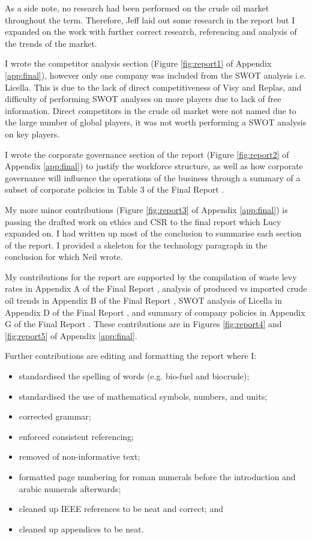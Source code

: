 \documentclass[11pt, a4, nocenter, margin=150mm]{article}
\begin{document}
	As a side note, no research had been performed on the crude oil market throughout the term. Therefore, Jeff laid out some research in the report but I expanded on the work with further correct research, referencing and analysis of the trends of the market.

	I wrote the competitor analysis section (Figure \ref{fig:report1} of Appendix \ref{app:final}), however only one company was included from the SWOT analysis i.e. Licella. This is due to the lack of direct competitiveness of Visy and Replas, and difficulty of performing SWOT analyses on more players due to lack of free information. Direct competitors in the crude oil market were not named due to the large number of global players, it was not worth performing a SWOT analysis on key players.

	I wrote the corporate governance section of the report (Figure \ref{fig:report2} of Appendix \ref{app:final}) to justify the workforce structure, as well as how corporate governance will influence the operations of the business through a summary of a subset of corporate policies in Table 3 of the Final Report \cite{report}.

	My more minor contributions (Figure \ref{fig:report3} of Appendix \ref{app:final}) is passing the drafted work on ethics and CSR to the final report which Lucy expanded on. I had written up most of the conclusion to summarise each section of the report. I provided a skeleton for the technology paragraph in the conclusion for which Neil wrote.

	My contributions for the report are supported by the compilation of waste levy rates in Appendix A of the Final Report \cite{report}, analysis of produced vs imported crude oil trends in Appendix B of the Final Report \cite{report}, SWOT analysis of Licella in Appendix D of the Final Report \cite{report}, and summary of company policies in Appendix G of the Final Report \cite{report}. These contributions are in Figures \ref{fig:report4} and \ref{fig:report5} of Appendix \ref{app:final}.

	Further contributions are editing and formatting the report where I:
	
	\begin{itemize}[noitemsep, nolistsep]
		\item standardised the spelling of words (e.g. bio-fuel and biocrude);
		\item standardised the use of mathematical symbols, numbers, and units;
		\item corrected grammar;
		\item enforced consistent referencing;
		\item removed of non-informative text;
		\item formatted page numbering for roman numerals before the introduction and arabic numerals afterwards;
		\item cleaned up IEEE references to be neat and correct; and
		\item cleaned up appendices to be neat.
	\end{itemize}
\end{document}
